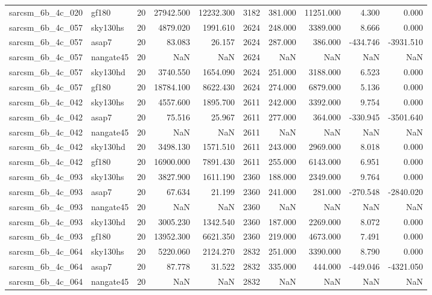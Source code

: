 \begin{tabular}{llrrrrrrrr}
sarcsm\_6b\_4c\_020 & gf180 & 20 & 27942.500 & 12232.300 & 3182 & 381.000 & 11251.000 & 4.300 & 0.000 \\
sarcsm\_6b\_4c\_057 & sky130hs & 20 & 4879.020 & 1991.610 & 2624 & 248.000 & 3389.000 & 8.666 & 0.000 \\
sarcsm\_6b\_4c\_057 & asap7 & 20 & 83.083 & 26.157 & 2624 & 287.000 & 386.000 & -434.746 & -3931.510 \\
sarcsm\_6b\_4c\_057 & nangate45 & 20 & NaN & NaN & 2624 & NaN & NaN & NaN & NaN \\
sarcsm\_6b\_4c\_057 & sky130hd & 20 & 3740.550 & 1654.090 & 2624 & 251.000 & 3188.000 & 6.523 & 0.000 \\
sarcsm\_6b\_4c\_057 & gf180 & 20 & 18784.100 & 8622.430 & 2624 & 274.000 & 6879.000 & 5.136 & 0.000 \\
sarcsm\_6b\_4c\_042 & sky130hs & 20 & 4557.600 & 1895.700 & 2611 & 242.000 & 3392.000 & 9.754 & 0.000 \\
sarcsm\_6b\_4c\_042 & asap7 & 20 & 75.516 & 25.967 & 2611 & 277.000 & 364.000 & -330.945 & -3501.640 \\
sarcsm\_6b\_4c\_042 & nangate45 & 20 & NaN & NaN & 2611 & NaN & NaN & NaN & NaN \\
sarcsm\_6b\_4c\_042 & sky130hd & 20 & 3498.130 & 1571.510 & 2611 & 243.000 & 2969.000 & 8.018 & 0.000 \\
sarcsm\_6b\_4c\_042 & gf180 & 20 & 16900.000 & 7891.430 & 2611 & 255.000 & 6143.000 & 6.951 & 0.000 \\
sarcsm\_6b\_4c\_093 & sky130hs & 20 & 3827.900 & 1611.190 & 2360 & 188.000 & 2349.000 & 9.764 & 0.000 \\
sarcsm\_6b\_4c\_093 & asap7 & 20 & 67.634 & 21.199 & 2360 & 241.000 & 281.000 & -270.548 & -2840.020 \\
sarcsm\_6b\_4c\_093 & nangate45 & 20 & NaN & NaN & 2360 & NaN & NaN & NaN & NaN \\
sarcsm\_6b\_4c\_093 & sky130hd & 20 & 3005.230 & 1342.540 & 2360 & 187.000 & 2269.000 & 8.072 & 0.000 \\
sarcsm\_6b\_4c\_093 & gf180 & 20 & 13952.300 & 6621.350 & 2360 & 219.000 & 4673.000 & 7.491 & 0.000 \\
sarcsm\_6b\_4c\_064 & sky130hs & 20 & 5220.060 & 2124.270 & 2832 & 251.000 & 3390.000 & 8.790 & 0.000 \\
sarcsm\_6b\_4c\_064 & asap7 & 20 & 87.778 & 31.522 & 2832 & 335.000 & 444.000 & -449.046 & -4321.050 \\
sarcsm\_6b\_4c\_064 & nangate45 & 20 & NaN & NaN & 2832 & NaN & NaN & NaN & NaN \\

\end{tabular}
